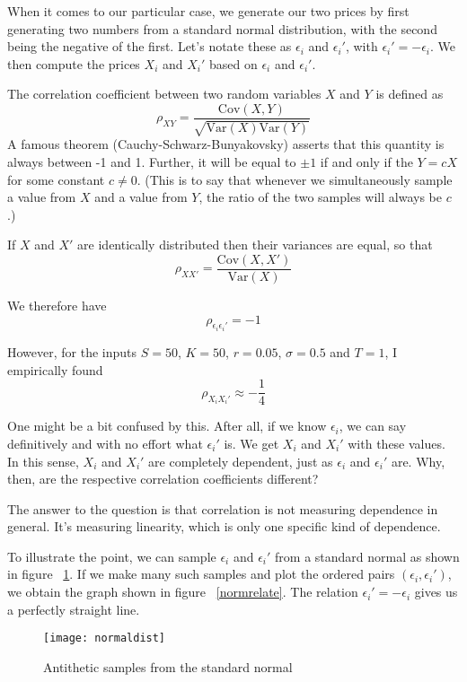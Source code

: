 \documentclass[12pt]{article}
\newcommand{\var}{\ensuremath{\text{Var}}}
\newcommand{\cov}{\ensuremath{\text{Cov}}}
\begin{document}
When it comes to our particular case, we generate our two prices by
first generating two numbers from a standard normal
distribution, with the second being the negative of the first.  Let's
notate these as $\epsilon_i$ and $\epsilon_i'$, with $\epsilon_i' =
- \epsilon_i$.  We then compute the prices $X_i$ and $X_i'$ based on
$\epsilon_i$ and $\epsilon_i'$.

The correlation coefficient between two random variables $X$ and $Y$
is defined as
$$ \rho_{XY} = \frac{\cov(X,Y)}{\sqrt{\var(X) \var(Y)}} $$
A famous theorem (Cauchy-Schwarz-Bunyakovsky) asserts that this
quantity is always between -1 and 1.  Further, it will be equal to
$\pm 1$ if and only if the $Y = cX$ for some constant $c \neq 0$.  (This is to
say that whenever we simultaneously sample a value from $X$ and a
value from $Y$, the ratio of the two samples will always be $c$.)

If $X$ and $X'$ are identically distributed then their variances are
equal, so that
$$ \rho_{XX'} = \frac{\cov(X,X')}{\var(X)} $$

We therefore have
$$ \rho_{\epsilon_i \epsilon_i'} = -1 $$

However, for the inputs $S = 50$, $K = 50$, $r = 0.05$, $\sigma = 0.5$
and $T = 1$, I empirically found
$$ \rho_{X_i X_i'} \approx -\frac{1}{4} $$

One might be a bit confused by this.  After all, if we know
$\epsilon_i$, we can say definitively and with no effort what
$\epsilon_i'$ is.  We get $X_i$ and $X_i'$ with these values.
In this sense, $X_i$ and $X_i'$ are completely dependent, just as
$\epsilon_i$ and $\epsilon_i'$ are.  Why, then, are the respective
correlation coefficients different?

The answer to the question is that correlation is not measuring
dependence in general.  It's measuring linearity, which is only one
specific kind of dependence.

To illustrate the point, we can sample $\epsilon_i$ and $\epsilon_i'$
from a standard normal as shown in figure ~\ref{normaldist}.  If we
make many such samples and plot the ordered pairs
$(\epsilon_i,\epsilon_i')$, we obtain the graph shown in figure
~\ref{normrelate}.  The relation $\epsilon_i' = -\epsilon_i$ gives us
a perfectly straight line.

\begin{figure}[h]
\centering
\texttt{[image: normaldist]}
\caption{Antithetic samples from the standard normal}
\label{normaldist}
\end{figure}
\end{document}
